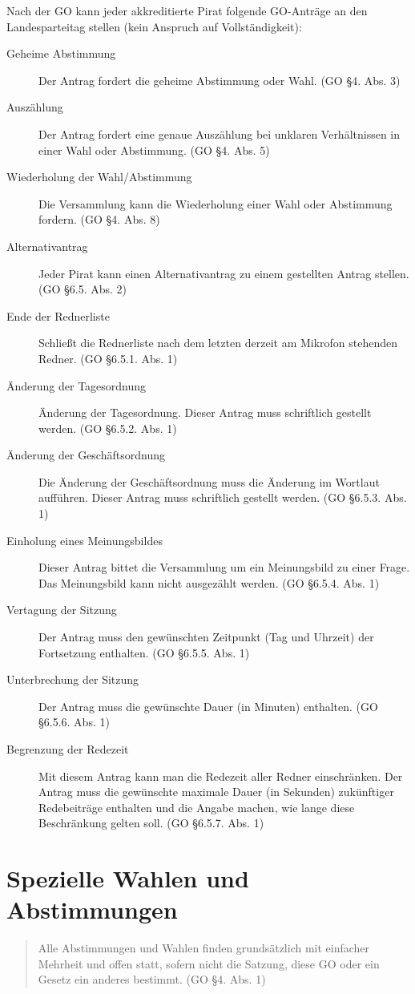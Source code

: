Nach der GO kann jeder akkreditierte Pirat folgende GO-Anträge an den Landesparteitag stellen (kein Anspruch auf Vollständigkeit):
\begin{description}
	\item[Geheime Abstimmung] Der Antrag fordert die geheime Abstimmung oder Wahl. (GO \S 4. Abs. 3)
	\item[Auszählung] Der Antrag fordert eine genaue Auszählung bei unklaren Verhältnissen in einer Wahl oder Abstimmung. (GO \S 4. Abs. 5)
	\item[Wiederholung der Wahl/Abstimmung] Die Versammlung kann die Wiederholung einer Wahl oder Abstimmung fordern. (GO \S 4. Abs. 8)
	\item[Alternativantrag] Jeder Pirat kann einen Alternativantrag zu einem gestellten Antrag stellen. (GO \S 6.5. Abs. 2)
	\item[Ende der Rednerliste] Schließt die Rednerliste nach dem letzten derzeit am Mikrofon stehenden Redner. (GO \S 6.5.1. Abs. 1)
	\item[Änderung der Tagesordnung] Änderung der Tagesordnung. Dieser Antrag muss schriftlich gestellt werden. (GO \S 6.5.2. Abs. 1)
	\item[Änderung der Geschäftsordnung] Die Änderung der Geschäftsordnung muss die Änderung im Wortlaut aufführen. Dieser Antrag muss schriftlich gestellt werden. (GO \S 6.5.3. Abs. 1)
	\item[Einholung eines Meinungsbildes] Dieser Antrag bittet die Versammlung um ein Meinungsbild zu einer Frage. Das Meinungsbild kann nicht ausgezählt werden. (GO \S 6.5.4. Abs. 1)
	\item[Vertagung der Sitzung] Der Antrag muss den gewünschten Zeitpunkt (Tag und Uhrzeit) der Fortsetzung enthalten. (GO \S 6.5.5. Abs. 1)
	\item[Unterbrechung der Sitzung] Der Antrag muss die gewünschte Dauer (in Minuten) enthalten. (GO \S 6.5.6. Abs. 1)
	\item[Begrenzung der Redezeit] Mit diesem Antrag kann man die Redezeit aller Redner einschränken. Der Antrag muss die gewünschte maximale Dauer (in Sekunden) zukünftiger Redebeiträge enthalten und die Angabe machen, wie lange diese Beschränkung gelten soll. (GO \S 6.5.7. Abs. 1)
\end{description}

\section{Spezielle Wahlen und Abstimmungen}
\begin{quote}
Alle Abstimmungen und Wahlen finden grundsätzlich mit einfacher Mehrheit und offen statt, sofern nicht die Satzung, diese GO oder ein Gesetz ein anderes bestimmt. (GO \S 4. Abs. 1)
\end{quote}

